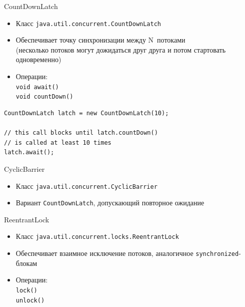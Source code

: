 \documentclass[unicode]{beamer}
\begin{document}
\begin{frame}{CountDownLatch}
\begin{itemize}
\item Класс \texttt{java.util.concurrent.CountDownLatch}
    \bigskip

\item Обеспечивает точку синхронизации между N~потоками\\
    (несколько потоков могут дожидаться друг друга и потом стартовать
    одновременно)
    \bigskip

\item Операции:\\
    \lstinline|void await()|\\
    \lstinline|void countDown()|
\end{itemize}
\end{frame}


\begin{frame}[fragile]
\begin{lstlisting}
CountDownLatch latch = new CountDownLatch(10);

// this call blocks until latch.countDown()
// is called at least 10 times
latch.await();
\end{lstlisting}
\end{frame}


\begin{frame}{CyclicBarrier}
\begin{itemize}
\item Класс \texttt{java.util.concurrent.CyclicBarrier}
    \bigskip

\item Вариант \texttt{CountDownLatch}, допускающий повторное ожидание
\end{itemize}
\end{frame}


\begin{frame}{ReentrantLock}
\begin{itemize}
\item Класс \texttt{java.util.concurrent.locks.ReentrantLock}
    \bigskip

\item Обеспечивает взаимное исключение потоков,
    аналогичное \lstinline|synchronized|-блокам
    \bigskip

\item Операции:\\
    \lstinline|lock()|\\
    \lstinline|unlock()|
\end{itemize}
\end{frame}
\end{document}

